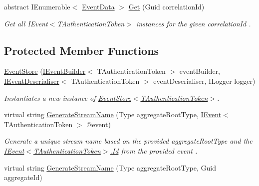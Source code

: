 \begin{DoxyCompactItemize}
abstract I\+Enumerable$<$ \hyperlink{classCqrs_1_1Events_1_1EventData}{Event\+Data} $>$ \hyperlink{classCqrs_1_1Events_1_1EventStore_a0096646f5dff730b0041b9469719c420_a0096646f5dff730b0041b9469719c420}{Get} (Guid correlation\+Id)
\begin{DoxyCompactList}\small\item\em Get all I\+Event$<$\+T\+Authentication\+Token$>$ instances for the given {\itshape correlation\+Id} . \end{DoxyCompactList}\end{DoxyCompactItemize}
\subsection*{Protected Member Functions}
\begin{DoxyCompactItemize}
\item 
\hyperlink{classCqrs_1_1Events_1_1EventStore_a6346cb2aea4c5b4e740dc6cfb15abab8_a6346cb2aea4c5b4e740dc6cfb15abab8}{Event\+Store} (\hyperlink{interfaceCqrs_1_1Events_1_1IEventBuilder}{I\+Event\+Builder}$<$ T\+Authentication\+Token $>$ event\+Builder, \hyperlink{interfaceCqrs_1_1Events_1_1IEventDeserialiser}{I\+Event\+Deserialiser}$<$ T\+Authentication\+Token $>$ event\+Deserialiser, I\+Logger logger)
\begin{DoxyCompactList}\small\item\em Instantiates a new instance of \hyperlink{classCqrs_1_1Events_1_1EventStore_a6346cb2aea4c5b4e740dc6cfb15abab8_a6346cb2aea4c5b4e740dc6cfb15abab8}{Event\+Store$<$\+T\+Authentication\+Token$>$}. \end{DoxyCompactList}\item 
virtual string \hyperlink{classCqrs_1_1Events_1_1EventStore_a03df06d4ce9c6d16201c079f2de0a7f3_a03df06d4ce9c6d16201c079f2de0a7f3}{Generate\+Stream\+Name} (Type aggregate\+Root\+Type, \hyperlink{interfaceCqrs_1_1Events_1_1IEvent}{I\+Event}$<$ T\+Authentication\+Token $>$ @event)
\begin{DoxyCompactList}\small\item\em Generate a unique stream name based on the provided {\itshape aggregate\+Root\+Type}  and the \hyperlink{interfaceCqrs_1_1Events_1_1IEvent_a2974e13d307c62c5cc438d668ff1783b_a2974e13d307c62c5cc438d668ff1783b}{I\+Event$<$\+T\+Authentication\+Token$>$.\+Id} from the provided {\itshape event} . \end{DoxyCompactList}\item 
virtual string \hyperlink{classCqrs_1_1Events_1_1EventStore_aba61739e47fdd0f7fce656f896cbe908_aba61739e47fdd0f7fce656f896cbe908}{Generate\+Stream\+Name} (Type aggregate\+Root\+Type, Guid aggregate\+Id)

\end{DoxyCompactItemize}
